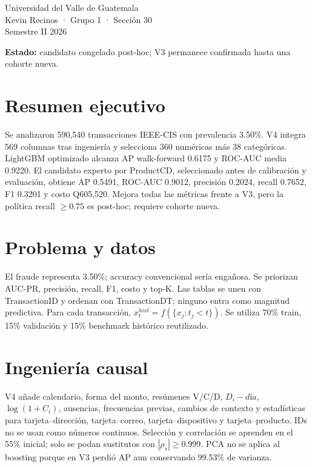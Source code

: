 \documentclass[10pt]{article}
\begin{document}
\begin{titlepage}\pagecolor{navy}\color{white}\raggedright\vspace*{1cm}{\Large DEEP LEARNING Y SISTEMAS INTELIGENTES\par}\vspace{1cm}{\Huge\bfseries Proyecto 1\\Monitoreo transaccional --- V4\par}\vspace{.7cm}{\LARGE Ingeniería causal, expertos y validación temporal\par}\vfill{\Large Universidad del Valle de Guatemala\\Kevin Recinos · Grupo 1 · Sección 30\\Semestre II 2026\par}\vspace{1cm}{\Large Wilson Alejandro Calderón Argueta · 22018\\Pablo Daniel Barillas Moreno · 22193\par}\vfill\textbf{Estado:} candidato congelado post-hoc; V3 permanece confirmada hasta una cohorte nueva.\end{titlepage}\nopagecolor

\section*{Resumen ejecutivo} Se analizaron 590,540 transacciones IEEE-CIS con prevalencia 3.50\%. V4 integra 569 columnas tras ingeniería y selecciona 360 numéricas más 38 categóricas. LightGBM optimizado alcanza AP walk-forward 0.6175 y ROC-AUC media 0.9220. El candidato experto por ProductCD, seleccionado antes de calibración y evaluación, obtiene AP 0.5491, ROC-AUC 0.9012, precisión 0.2024, recall 0.7652, F1 0.3201 y costo Q605,520. Mejora todas las métricas frente a V3, pero la política recall $\ge0.75$ es post-hoc; requiere cohorte nueva.

\section{Problema y datos} El fraude representa 3.50\%; accuracy convencional sería engañosa. Se priorizan AUC-PR, precisión, recall, F1, costo y top-K. Las tablas se unen con TransactionID y ordenan con TransactionDT; ninguno entra como magnitud predictiva. Para cada transacción, $x_t^{hist}=f(\{x_j:t_j<t\})$. Se utiliza 70\% train, 15\% validación y 15\% benchmark histórico reutilizado.

\section{Ingeniería causal} V4 añade calendario, forma del monto, resúmenes V/C/D, $D_i-día$, $\log(1+C_i)$, ausencias, frecuencias previas, cambios de contexto y estadísticas para tarjeta--dirección, tarjeta--correo, tarjeta--dispositivo y tarjeta--producto. IDs no se usan como números continuos. Selección y correlación se aprenden en el 55\% inicial; solo se podan sustitutos con $|\rho_s|\ge0.999$. PCA no se aplica al boosting porque en V3 perdió AP aun conservando 99.53\% de varianza.
\newpage
\end{document}
